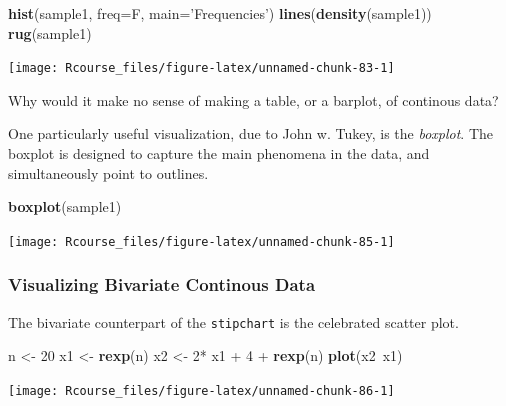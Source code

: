 \documentclass[]{book}
\newenvironment{Shaded}{\begin{snugshade}}{\end{snugshade}}
\newcommand{\KeywordTok}[1]{\textcolor[rgb]{0.13,0.29,0.53}{\textbf{{#1}}}}
\newcommand{\DataTypeTok}[1]{\textcolor[rgb]{0.13,0.29,0.53}{{#1}}}
\newcommand{\DecValTok}[1]{\textcolor[rgb]{0.00,0.00,0.81}{{#1}}}
\newcommand{\StringTok}[1]{\textcolor[rgb]{0.31,0.60,0.02}{{#1}}}
\newcommand{\NormalTok}[1]{{#1}}
\theoremstyle{definition}
\theoremstyle{definition}
\theoremstyle{remark}
\let\BeginKnitrBlock\begin \let\EndKnitrBlock\end
\begin{document}
\begin{Shaded}
\begin{Highlighting}[]
\KeywordTok{hist}\NormalTok{(sample1, }\DataTypeTok{freq=}\NormalTok{F, }\DataTypeTok{main=}\StringTok{'Frequencies'}\NormalTok{)   }
\KeywordTok{lines}\NormalTok{(}\KeywordTok{density}\NormalTok{(sample1))                     }
\KeywordTok{rug}\NormalTok{(sample1)}
\end{Highlighting}
\end{Shaded}

\texttt{[image: Rcourse\_files/figure-latex/unnamed-chunk-83-1]}

\BeginKnitrBlock{remark}
Why would it make no sense of making a table, or
a barplot, of continous data?
\EndKnitrBlock{remark}

One particularly useful visualization, due to John w. Tukey, is the
\emph{boxplot}. The boxplot is designed to capture the main phenomena in
the data, and simultaneously point to outlines.

\begin{Shaded}
\begin{Highlighting}[]
\KeywordTok{boxplot}\NormalTok{(sample1)    }
\end{Highlighting}
\end{Shaded}

\texttt{[image: Rcourse\_files/figure-latex/unnamed-chunk-85-1]}

\subsubsection{Visualizing Bivariate Continous
Data}\label{visualizing-bivariate-continous-data}

The bivariate counterpart of the \texttt{stipchart} is the celebrated
scatter plot.

\begin{Shaded}
\begin{Highlighting}[]
\NormalTok{n <-}\StringTok{ }\DecValTok{20}
\NormalTok{x1 <-}\StringTok{ }\KeywordTok{rexp}\NormalTok{(n)}
\NormalTok{x2 <-}\StringTok{ }\DecValTok{2}\NormalTok{*}\StringTok{ }\NormalTok{x1 +}\StringTok{ }\DecValTok{4} \NormalTok{+}\StringTok{ }\KeywordTok{rexp}\NormalTok{(n)}
\KeywordTok{plot}\NormalTok{(x2~x1)}
\end{Highlighting}
\end{Shaded}

\texttt{[image: Rcourse\_files/figure-latex/unnamed-chunk-86-1]}
\end{document}
